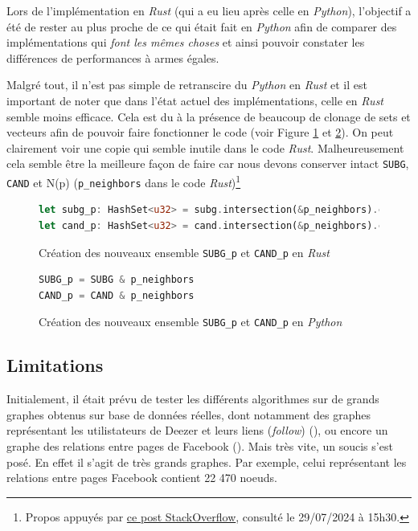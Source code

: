 \documentclass[12pt,a4paper]{article}
\begin{document}
Lors de l'implémentation en \emph{Rust} (qui a eu lieu après celle en \emph{Python}), l'objectif a été de rester au plus proche de ce qui était fait en \emph{Python} afin de comparer des implémentations qui \og \textit{font les mêmes choses} \fg{} et ainsi pouvoir constater les différences de performances à armes égales.

Malgré tout, il n'est pas simple de retranscire du \emph{Python} en \emph{Rust} et il est important de noter que dans l'état actuel des implémentations, celle en \emph{Rust} semble moins efficace. Cela est du à la présence de beaucoup de clonage de sets et vecteurs afin de pouvoir faire fonctionner le code (voir Figure \ref{fig:r2} et \ref{fig:p2}). On peut clairement voir une copie qui semble inutile dans le code \emph{Rust}. Malheureusement cela semble être la meilleure façon de faire car nous devons conserver intact \texttt{SUBG}, \texttt{CAND} et N(p) (\texttt{p\_neighbors} dans le code \emph{Rust})\footnote{Propos appuyés par \href{https://stackoverflow.com/questions/55975234/how-do-i-intersect-two-hashsets-while-moving-values-in-common-into-a-new-set}{ce post StackOverflow}, consulté le 29/07/2024 à 15h30.}
\begin{figure}[ht]
  \begin{lstlisting}[language=Rust]
let subg_p: HashSet<u32> = subg.intersection(&p_neighbors).cloned().collect();
let cand_p: HashSet<u32> = cand.intersection(&p_neighbors).cloned().collect();
  \end{lstlisting}
  \caption{Création des nouveaux ensemble \texttt{SUBG\_p} et \texttt{CAND\_p} en \emph{Rust}}
  \label{fig:r2}
\end{figure}
\begin{figure}[ht]
  \begin{lstlisting}[language=Python]
SUBG_p = SUBG & p_neighbors
CAND_p = CAND & p_neighbors
  \end{lstlisting}
  \caption{Création des nouveaux ensemble \texttt{SUBG\_p} et \texttt{CAND\_p} en \emph{Python}}
  \label{fig:p2}
\end{figure}
\subsection{Limitations}%
\label{subsec:limit}

Initialement, il était prévu de tester les différents algorithmes sur de grands graphes obtenus sur base de données réelles, dont notamment des graphes représentant les utilistateurs de Deezer et leurs liens (\emph{follow}) (\cite{rozemberczki2020characteristic}), ou encore un graphe des relations entre pages de Facebook (\cite{rozemberczki2019multiscale}). Mais très vite, un soucis s'est posé. En effet il s'agit de très grands graphes. Par exemple, celui représentant les relations entre pages Facebook contient 22 470 noeuds.
\end{document}
